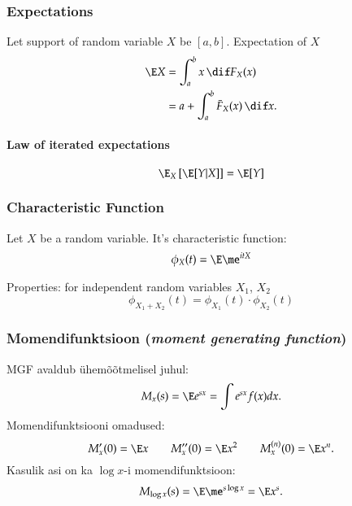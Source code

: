 \documentclass[a4paper]{article}
\numberwithin{equation}{subsection}
\begin{document}
\subsubsection{Expectations}
Let support of random variable $X$ be $[a, b]$.  Expectation of $X$
\begin{align}
  \E X
  &=
  \int_a^b x \, \dif F_X(x)\\
  &=
  a + \int_a^b \bar F_X(x) \,\dif x.
\end{align}

\paragraph{Law of iterated expectations}
\begin{equation}
  \E_X
  \left[ \E [Y|X] \right]
  =
  \E [Y]
\end{equation}


\subsubsection{Characteristic  Function}
\label{sec:characteristic_function}

Let $X$ be a random variable.  It's characteristic function:
\begin{equation}
  \label{eq:characteristic_function}
  \phi_{X}(t) = \E \me^{itX}
\end{equation}

Properties: for independent random variables $X_{1}$, $X_{2}$
\begin{equation}
  \phi_{X_{1} + X_{2}}(t) = \phi_{X_{1}}(t) \cdot \phi_{X_{2}}(t)
\end{equation}

\subsubsection{Momendifunktsioon (\emph{moment generating function})}

MGF avaldub ühemõõtmelisel juhul:
\begin{equation}
M_x (s) = \E e^{sx} = \int e^{sx} f(x) dx.
\end{equation}
Momendifunktsiooni omadused:
\begin{equation}
M_x'(0) = \E x \qquad M_x''(0) = \E x^2 \qquad 
  M_x^{(n)}(0) = \E x^n.
\end{equation}
Kasulik asi on ka $\log x$-i momendifunktsioon:
\begin{equation}
M_{\log x}(s) = \E \me^{s \log x} = \E x^s.
\end{equation}
\end{document}
